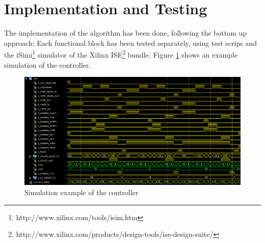 \documentclass[mscthesis]{usiinfthesis}
\begin{document}

\section{Implementation and Testing}

The implementation of the algorithm has been done, following the bottom up
approach: Each functional block has been tested separately, using test scrips
and the iSimi\footnote{http://www.xilinx.com/tools/isim.htm} simulator of the
Xilinx
ISE\footnote{http://www.xilinx.com/products/design-tools/ise-design-suite/}
bundle. Figure \ref{fig:test_ctrl} shows an example simulation of the
controller.

\begin{figure}
    \includegraphics[width=1\columnwidth]{./schema/test_ctrl.png}
    \caption{Simulation example of the controller}
    \label{fig:test_ctrl}
\end{figure}
\end{document}
